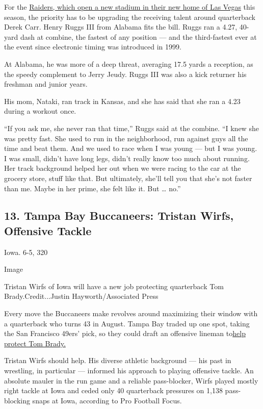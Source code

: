 For the
\href{https://www.nytimes3xbfgragh.onion/2019/12/13/sports/football/oakland-raiders-las-vegas-stadium.html}{Raiders,
which open a new stadium in their new home of Las Vegas} this season,
the priority has to be upgrading the receiving talent around quarterback
Derek Carr. Henry Ruggs III from Alabama fits the bill. Ruggs ran a
4.27, 40-yard dash at combine, the fastest of any position --- and the
third-fastest ever at the event since electronic timing was introduced
in 1999.

At Alabama, he was more of a deep threat, averaging 17.5 yards a
reception, as the speedy complement to Jerry Jeudy. Ruggs III was also a
kick returner his freshman and junior years.

His mom, Nataki, ran track in Kansas, and she has said that she ran a
4.23 during a workout once.

``If you ask me, she never ran that time,'' Ruggs said at the combine.
``I knew she was pretty fast. She used to run in the neighborhood, run
against guys all the time and beat them. And we used to race when I was
young --- but I was young. I was small, didn't have long legs, didn't
really know too much about running. Her track background helped her out
when we were racing to the car at the grocery store, stuff like that.
But ultimately, she'll tell you that she's not faster than me. Maybe in
her prime, she felt like it. But \ldots{} no.''

\hypertarget{13-tampa-bay-buccaneers-tristan-wirfs-offensive-tackle}{%
\subsection{13. Tampa Bay Buccaneers: Tristan Wirfs, Offensive
Tackle}\label{13-tampa-bay-buccaneers-tristan-wirfs-offensive-tackle}}

Iowa. 6-5, 320

Image

Tristan Wirfs of Iowa will have a new job protecting quarterback Tom
Brady.Credit...Justin Hayworth/Associated Press

Every move the Buccaneers make revolves around maximizing their window
with a quarterback who turns 43 in August. Tampa Bay traded up one spot,
taking the San Francisco 49ers' pick, so they could draft an offensive
lineman
to\href{https://www.nytimes3xbfgragh.onion/2020/03/20/sports/football/tom-brady-signed-tampa-bay.html}{help
protect Tom Brady.}

Tristan Wirfs should help. His diverse athletic background --- his past
in wrestling, in particular --- informed his approach to playing
offensive tackle. An absolute mauler in the run game and a reliable
pass-blocker, Wirfs played mostly right tackle at Iowa and ceded only 40
quarterback pressures on 1,138 pass-blocking snaps at Iowa, according to
Pro Football Focus.

